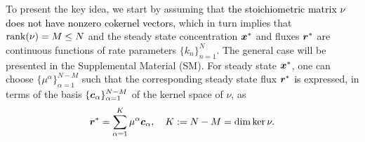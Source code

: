\documentclass[ amsmath,amssymb,nofootinbib
]{revtex4-1}
\def\mbf#1{\mbox{\boldmath $#1$}}
\newcommand{\bx}{{\mbf x}}
\newcommand{\bc}{{\bf c}}
\newcommand{\br}{{\mbf r}}
\newcommand{\dk}{{\rm \dim ker}\, }
\newcommand{\corr}[1]{\textcolor{black}{#1}}
\begin{document}
To present the key idea, we start by assuming that \corr{ the stoichiometric matrix  $\nu$ does not have nonzero cokernel vectors,} which in turn implies that \corr{${\rm rank}(\nu) = M \le N$} and the steady state concentration $\bx^*$ and fluxes $\br^*$
are continuous functions of rate parameters $\{ k_n \}_{n=1}^N$.  
The general case will be presented in the Supplemental Material (SM).
For  steady state $\bx^*$,
one can choose $\{\mu^\alpha\}_{\alpha=1}^{N-M}$  such that
the corresponding steady state flux $\br^*$ \corr{is} expressed,
in terms of the basis $\{{\mbf c}_\alpha\}_{\alpha=1}^{N-M}$ of the kernel space  of $\nu$, as
\begin{align} \label{ker_temp30}
   \br^* = \sum_{\alpha=1}^K \mu^\alpha {\mbf c}_\alpha, \quad K := N-M = \dk  \nu.
\end{align}
%
\end{document}
